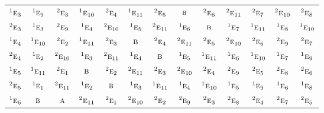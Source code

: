 \documentclass[10pt,a4paper]{article}
\numberwithin{equation}{section}
\newcommand{\irr}[1]{\text{\normalfont\scshape #1}}
\newcommand{\conjpair}[1]{{}^{#1}}
\begin{document}
{\begin{longtable}{@{}lcccccccccccc@{}}
$\conjpair{1}\irr{e}_{3}$ & $\conjpair{1}\irr{e}_{9}$ & $\conjpair{2}\irr{e}_{3}$ & $\conjpair{1}\irr{e}_{10}$ & $\conjpair{2}\irr{e}_{4}$ & $\conjpair{1}\irr{e}_{11}$ & $\conjpair{2}\irr{e}_{5}$ & $\irr{b}$ & $\conjpair{2}\irr{e}_{6}$ & $\conjpair{2}\irr{e}_{11}$ & $\conjpair{2}\irr{e}_{7}$ & $\conjpair{2}\irr{e}_{10}$ & $\conjpair{2}\irr{e}_{8}$\\
$\conjpair{2}\irr{e}_{3}$ & $\conjpair{1}\irr{e}_{3}$ & $\conjpair{2}\irr{e}_{9}$ & $\conjpair{1}\irr{e}_{4}$ & $\conjpair{2}\irr{e}_{10}$ & $\conjpair{1}\irr{e}_{5}$ & $\conjpair{2}\irr{e}_{11}$ & $\conjpair{1}\irr{e}_{6}$ & $\irr{b}$ & $\conjpair{1}\irr{e}_{7}$ & $\conjpair{1}\irr{e}_{11}$ & $\conjpair{1}\irr{e}_{8}$ & $\conjpair{1}\irr{e}_{10}$\\
$\conjpair{1}\irr{e}_{4}$ & $\conjpair{1}\irr{e}_{10}$ & $\conjpair{2}\irr{e}_{2}$ & $\conjpair{1}\irr{e}_{11}$ & $\conjpair{2}\irr{e}_{3}$ & $\irr{b}$ & $\conjpair{2}\irr{e}_{4}$ & $\conjpair{2}\irr{e}_{11}$ & $\conjpair{2}\irr{e}_{5}$ & $\conjpair{2}\irr{e}_{10}$ & $\conjpair{2}\irr{e}_{6}$ & $\conjpair{2}\irr{e}_{9}$ & $\conjpair{2}\irr{e}_{7}$\\
$\conjpair{2}\irr{e}_{4}$ & $\conjpair{1}\irr{e}_{2}$ & $\conjpair{2}\irr{e}_{10}$ & $\conjpair{1}\irr{e}_{3}$ & $\conjpair{2}\irr{e}_{11}$ & $\conjpair{1}\irr{e}_{4}$ & $\irr{b}$ & $\conjpair{1}\irr{e}_{5}$ & $\conjpair{1}\irr{e}_{11}$ & $\conjpair{1}\irr{e}_{6}$ & $\conjpair{1}\irr{e}_{10}$ & $\conjpair{1}\irr{e}_{7}$ & $\conjpair{1}\irr{e}_{9}$\\
$\conjpair{1}\irr{e}_{5}$ & $\conjpair{1}\irr{e}_{11}$ & $\conjpair{2}\irr{e}_{1}$ & $\irr{b}$ & $\conjpair{2}\irr{e}_{2}$ & $\conjpair{2}\irr{e}_{11}$ & $\conjpair{2}\irr{e}_{3}$ & $\conjpair{2}\irr{e}_{10}$ & $\conjpair{2}\irr{e}_{4}$ & $\conjpair{2}\irr{e}_{9}$ & $\conjpair{2}\irr{e}_{5}$ & $\conjpair{2}\irr{e}_{8}$ & $\conjpair{2}\irr{e}_{6}$\\
$\conjpair{2}\irr{e}_{5}$ & $\conjpair{1}\irr{e}_{1}$ & $\conjpair{2}\irr{e}_{11}$ & $\conjpair{1}\irr{e}_{2}$ & $\irr{b}$ & $\conjpair{1}\irr{e}_{3}$ & $\conjpair{1}\irr{e}_{11}$ & $\conjpair{1}\irr{e}_{4}$ & $\conjpair{1}\irr{e}_{10}$ & $\conjpair{1}\irr{e}_{5}$ & $\conjpair{1}\irr{e}_{9}$ & $\conjpair{1}\irr{e}_{6}$ & $\conjpair{1}\irr{e}_{8}$\\
$\conjpair{1}\irr{e}_{6}$ & $\irr{b}$ & $\irr{a}$ & $\conjpair{2}\irr{e}_{11}$ & $\conjpair{2}\irr{e}_{1}$ & $\conjpair{2}\irr{e}_{10}$ & $\conjpair{2}\irr{e}_{2}$ & $\conjpair{2}\irr{e}_{9}$ & $\conjpair{2}\irr{e}_{3}$ & $\conjpair{2}\irr{e}_{8}$ & $\conjpair{2}\irr{e}_{4}$ & $\conjpair{2}\irr{e}_{7}$ & $\conjpair{2}\irr{e}_{5}$\\

\end{longtable}}
\end{document}
